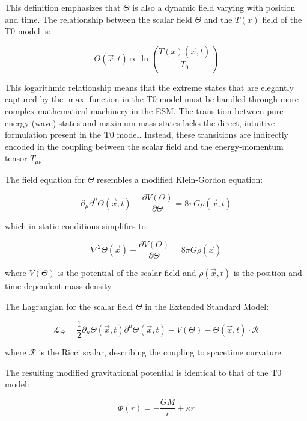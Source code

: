 \documentclass[12pt,a4paper]{article}
\newcommand{\Tfield}{T(x)}
\newcommand{\Tzero}{T_0}
\newcommand{\vecx}{\vec{x}}
\begin{document}
	This definition emphasizes that \(\Theta\) is also a dynamic field varying with position and time. The relationship between the scalar field \(\Theta\) and the \(\Tfield\) field of the T0 model is:
	
	\begin{equation}
		\Theta(\vecx,t) \propto \ln\left(\frac{\Tfield(\vecx,t)}{\Tzero}\right)
	\end{equation}
	
	This logarithmic relationship means that the extreme states that are elegantly captured by the \(\max\) function in the T0 model must be handled through more complex mathematical machinery in the ESM. The transition between pure energy (wave) states and maximum mass states lacks the direct, intuitive formulation present in the T0 model. Instead, these transitions are indirectly encoded in the coupling between the scalar field and the energy-momentum tensor \(T_{\mu\nu}\).
	
	The field equation for \(\Theta\) resembles a modified Klein-Gordon equation:
	
	\begin{equation}
		\partial_{\mu}\partial^{\mu}\Theta(\vecx,t) - \frac{\partial V(\Theta)}{\partial \Theta} = 8\pi G \rho(\vecx,t)
	\end{equation}
	
	which in static conditions simplifies to:
	
	\begin{equation}
		\nabla^2 \Theta(\vecx) - \frac{\partial V(\Theta)}{\partial \Theta} = 8\pi G \rho(\vecx)
	\end{equation}
	
	where \(V(\Theta)\) is the potential of the scalar field and \(\rho(\vecx,t)\) is the position and time-dependent mass density.
	
	The Lagrangian for the scalar field \(\Theta\) in the Extended Standard Model:
	
	\begin{equation}
		\mathcal{L}_{\Theta} = \frac{1}{2}\partial_{\mu}\Theta(\vecx,t)\partial^{\mu}\Theta(\vecx,t) - V(\Theta) - \Theta(\vecx,t) \cdot \mathcal{R}
	\end{equation}
	
	where \(\mathcal{R}\) is the Ricci scalar, describing the coupling to spacetime curvature.
	
	The resulting modified gravitational potential is identical to that of the T0 model:
	
	\begin{equation}
		\Phi(r) = -\frac{GM}{r} + \kappa r
	\end{equation}
	
\end{document}
